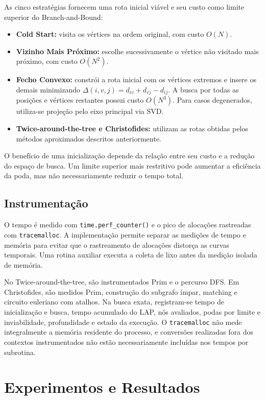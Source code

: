 As cinco estratégias fornecem uma rota inicial viável e seu custo como limite superior do Branch-and-Bound:
\begin{itemize}
\item \textbf{Cold Start:} visita os vértices na ordem original, com custo $O(N)$.
\item \textbf{Vizinho Mais Próximo:} escolhe sucessivamente o vértice não visitado mais próximo, com custo $O(N^2)$.
\item \textbf{Fecho Convexo:} constrói a rota inicial com os vértices extremos e insere os demais minimizando $\Delta(i,v,j)=d_{iv}+d_{vj}-d_{ij}$. A busca por todas as posições e vértices restantes possui custo $O(N^3)$. Para casos degenerados, utiliza-se projeção pelo eixo principal via SVD.
\item \textbf{Twice-around-the-tree e Christofides:} utilizam as rotas obtidas pelos métodos aproximados descritos anteriormente.
\end{itemize}
O benefício de uma inicialização depende da relação entre seu custo e a redução do espaço de busca. Um limite superior mais restritivo pode aumentar a eficiência da poda, mas não necessariamente reduzir o tempo total.

\subsection{Instrumentação}

O tempo é medido com \texttt{time.perf\_counter()} e o pico de alocações rastreadas com \texttt{tracemalloc}. A implementação permite separar as medições de tempo e memória para evitar que o rastreamento de alocações distorça as curvas temporais. Uma rotina auxiliar executa a coleta de lixo antes da medição isolada de memória.

No Twice-around-the-tree, são instrumentados Prim e o percurso DFS. Em Christofides, são medidos Prim, construção do subgrafo ímpar, matching e circuito euleriano com atalhos. Na busca exata, registram-se tempo de inicialização e busca, tempo acumulado do LAP, nós avaliados, podas por limite e inviabilidade, profundidade e estado da execução. O \texttt{tracemalloc} não mede integralmente a memória residente do processo, e conversões realizadas fora dos contextos instrumentados não estão necessariamente incluídas nos tempos por subrotina.

\section{Experimentos e Resultados}

